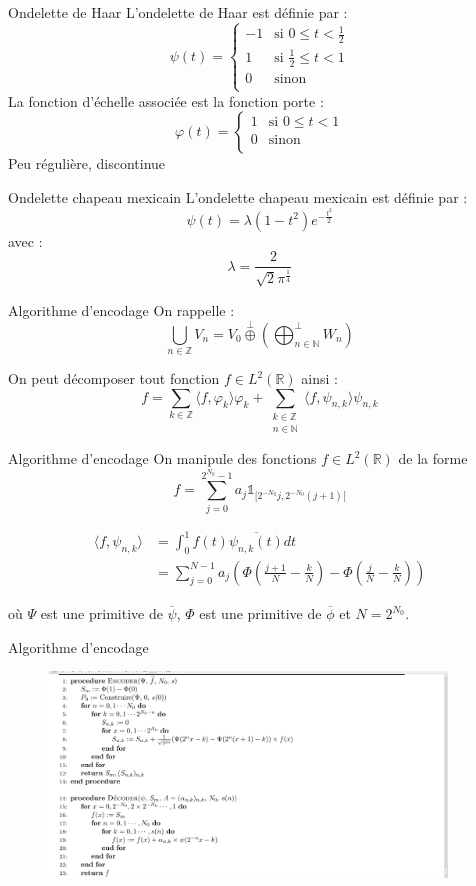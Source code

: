\documentclass[french]{beamer}
\begin{document}
\begin{frame}{Ondelette de Haar}
	L'ondelette de Haar est définie par :
	$$ \psi(t) = \begin{cases}
	-1&\text{si $0\leqslant t < \frac12$} \\
	1&\text{si $\frac12\leqslant t < 1$} \\
	0&\text{sinon} \\
	\end{cases}$$
	La fonction d'échelle associée est la fonction porte :
	$$ \varphi(t) = \begin{cases}
	1&\text{si $0\leqslant t < 1$} \\
	0&\text{sinon} \\
	\end{cases}$$
	Peu régulière, discontinue
\end{frame}

\begin{frame}{Ondelette chapeau mexicain}
	L'ondelette chapeau mexicain est définie par :
	$$ \psi(t) = \lambda \left(1-t^2\right) e^{-\frac{t^2}{2}} $$
	avec :
	$$\lambda = \frac{2}{\sqrt{2}\pi^{\frac14}}$$
\end{frame}

\begin{frame}{Algorithme d'encodage}
	On rappelle :
	$$\bigcup_{n \in \mathbb{Z}} V_n = V_0 \stackrel{\perp}{\oplus} \left(\bigoplus^{\bot}_{n \in \mathbb{N}} W_n\right)$$
	
	On peut décomposer tout fonction $f \in L^2(\mathbb{R})$ ainsi : $$f = \sum_{k \in \mathbb{Z}} \langle f,\varphi_k \rangle \varphi_k + \sum_{\substack{k \in \mathbb{Z} \\ n \in \mathbb{N}}} \langle f,\psi_{n, k} \rangle \psi_{n, k}$$
\end{frame}

\begin{frame}{Algorithme d'encodage}
	On manipule des fonctions $f \in L^2(\mathbb{R})$ de la forme $$f = \sum_{j = 0}^{2^{N_0} - 1} a_j \mathbb{1}_{[2^{-N_0}j, 2^{-N_0}(j+1)[}$$
	
	\begin{align*}
	\langle f, \psi_{n, k} \rangle &= \int_0^1 f(t) \overline{\psi_{n, k}(t)} dt \\&= \sum_{j=0}^{N-1} a_j \left(\Phi\left(\frac{j+1}N - \frac{k}{N}\right) - \Phi\left(\frac{j}N - \frac{k}{N}\right)\right)
	\end{align*}
	
	où $\Psi$ est une primitive de $\overline{\psi}$, $\Phi$ est une primitive de $\overline{\phi}$ et $N = 2^{N_0}$.
\end{frame}

\begin{frame}{Algorithme d'encodage}
	\begin{figure}[h]
		\centering
		\includegraphics[width=300pt]{algo.png}

	\end{figure}

\end{frame}
\end{document}
